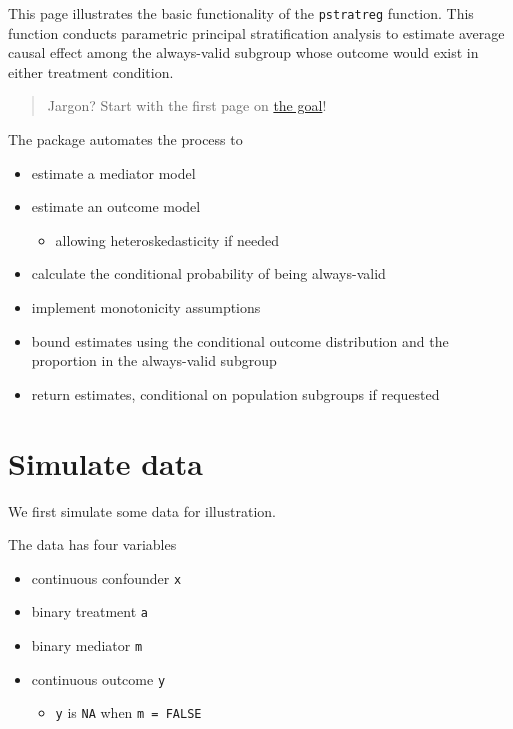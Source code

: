 \documentclass[
]{book}
\providecommand{\tightlist}{%
  \setlength{\itemsep}{0pt}\setlength{\parskip}{0pt}}
\begin{document}
This page illustrates the basic functionality of the \texttt{pstratreg} function. This function conducts parametric principal stratification analysis to estimate average causal effect among the always-valid subgroup whose outcome would exist in either treatment condition.

\begin{quote}
Jargon? Start with the first page on \protect\hyperlink{the-goal}{the goal}!
\end{quote}

The package automates the process to

\begin{itemize}
\tightlist
\item
  estimate a mediator model
\item
  estimate an outcome model

  \begin{itemize}
  \tightlist
  \item
    allowing heteroskedasticity if needed
  \end{itemize}
\item
  calculate the conditional probability of being always-valid
\item
  implement monotonicity assumptions
\item
  bound estimates using the conditional outcome distribution and the proportion in the always-valid subgroup
\item
  return estimates, conditional on population subgroups if requested
\end{itemize}

\hypertarget{simulate-data}{%
\section{Simulate data}\label{simulate-data}}

We first simulate some data for illustration.

The data has four variables

\begin{itemize}
\tightlist
\item
  continuous confounder \texttt{x}
\item
  binary treatment \texttt{a}
\item
  binary mediator \texttt{m}
\item
  continuous outcome \texttt{y}

  \begin{itemize}
  \tightlist
  \item
    \texttt{y} is \texttt{NA} when \texttt{m\ =\ FALSE}
  \end{itemize}
\end{itemize}
\end{document}
